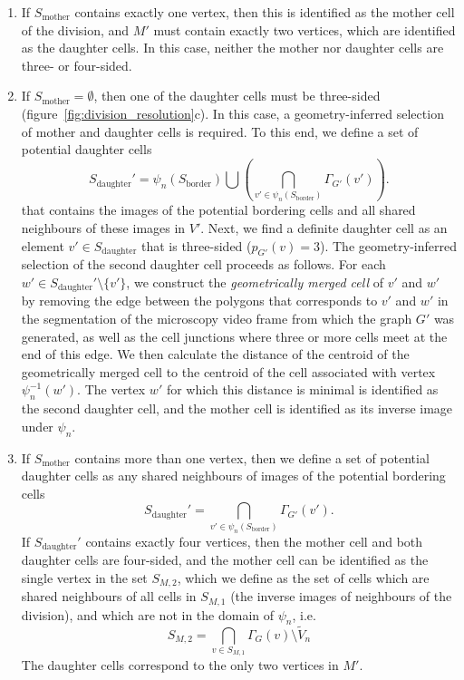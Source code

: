 \documentclass[a4paper,11pt]{article}
\begin{document}
\begin{enumerate}[noitemsep,label=(\roman*)]
\item If $S_{\mathrm{mother}}$ contains exactly one vertex, then this is identified as the mother cell of the division, and $M'$ must contain exactly two vertices, which are identified as the daughter cells. 
In this case, neither the mother nor daughter cells are three- or four-sided. 

\item If $S_{\mathrm{mother}} = \emptyset$, then one of the daughter cells must be three-sided (figure~\ref{fig:division_resolution}c). 
In this case, a geometry-inferred selection of mother and daughter cells is required. 
To this end, we define a set of potential daughter cells
%
\begin{equation}
S_{\mathrm{daughter}}' = \psi_{n} (S_{\mathrm{border}}) \bigcup \left( \bigcap_{v' \in \psi_{n} ( S_{\mathrm{border}}) } \Gamma_{G'}(v') \right).
\end{equation}
%
that contains the images of the potential bordering cells and all shared neighbours of these images in $V'$. 
Next, we find a definite daughter cell as an element $v' \in S_{\mathrm{daughter}}$ that is three-sided ($p_{G'}(v) = 3$). 
The geometry-inferred selection of the second daughter cell proceeds as follows. 
For each $w' \in S_{\mathrm{daughter}}' \setminus \{ v' \}$, we construct the \textit{geometrically merged cell} of $v'$ and $w'$ by removing the edge between the polygons that corresponds to $v'$ and $w'$ in the segmentation of the microscopy video frame from which the graph $G'$ was generated, as well as the cell junctions where three or more cells meet at the end of this edge. 
We then calculate the distance of the centroid of the geometrically merged cell to the centroid of the cell associated with vertex $\psi^{-1}_{n}(w')$.
The vertex $w'$ for which this distance is minimal is identified as the second daughter cell, and the mother cell is identified as its inverse image under $\psi_{n}$.

\item If $S_{\mathrm{mother}}$ contains more than one vertex, then we define a set of potential daughter cells as any shared neighbours of images of the potential bordering cells
%
\begin{equation}
S_{\mathrm{daughter}}' = \bigcap_{v' \in \psi_{n} (S_{\mathrm{border}})} \Gamma_{G'}(v').
\end{equation}
%
If $S_{\mathrm{daughter}}'$ contains exactly four vertices, then the mother cell and both daughter cells are four-sided, and the mother cell can be identified as the single vertex in the set $S_{M,2}$, which we define as the set of cells which are shared neighbours of all cells in $S_{M,1}$ (the inverse images of neighbours of the division), and which are not in the domain of $\psi_{n}$, i.e. 
%
\begin{equation}
S_{M,2} = \bigcap_{v \in S_{M,1}}\Gamma_G(v)\setminus \tilde{V}_{n}
\end{equation}
%
The daughter cells correspond to the only two vertices in $M'$. 


\end{enumerate}
\end{document}
